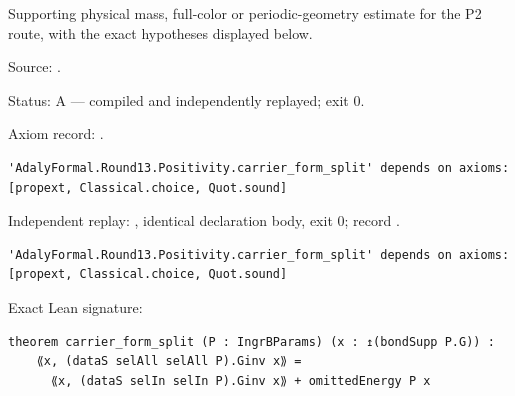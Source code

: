 \begin{theorem}[bp-452]
\label{bp-452}
\leanok
Supporting physical mass, full-color or periodic-geometry estimate for the P2 route, with the exact hypotheses displayed below.

\par Source: \texttt{}.
\par Status: A — compiled and independently replayed; exit 0.
\par Axiom record: \texttt{}.
\begin{verbatim}
'AdalyFormal.Round13.Positivity.carrier_form_split' depends on axioms: [propext, Classical.choice, Quot.sound]
\end{verbatim}
\par Independent replay: \texttt{}, identical declaration body, exit 0; record \texttt{}.
\begin{verbatim}
'AdalyFormal.Round13.Positivity.carrier_form_split' depends on axioms: [propext, Classical.choice, Quot.sound]
\end{verbatim}
\par Exact Lean signature:
\begin{verbatim}
theorem carrier_form_split (P : IngrBParams) (x : ↥(bondSupp P.G)) :
    ⟪x, (dataS selAll selAll P).Ginv x⟫ =
      ⟪x, (dataS selIn selIn P).Ginv x⟫ + omittedEnergy P x
\end{verbatim}
\end{theorem}

